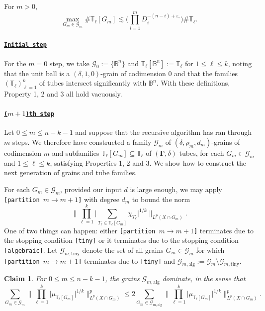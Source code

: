 \documentclass[reqno]{amsart}
\numberwithin{equation}{section}
\newcommand{\B}{\mathbb{B}}
\newcommand{\T}{\mathbb{T}}
\newcommand{\cG}{\mathcal{G}}
\newcommand{\bdGamma}{\boldsymbol{\Gamma}}
\theoremstyle{plain}
\newtheorem{claim}[theorem]{Claim}
\theoremstyle{definition}
\newcommand{\ttiny}{\mathrm{tiny}}
\newcommand{\alg}{\mathrm{alg}}
\begin{document}
  For $m > 0$,
\begin{equation}\tag*{$(3)_m$}
    \max_{G_m \in \cG_m} \# \T_{\ell}[G_m] \lesssim \Big(\prod_{i=1}^m D_i^{-(n-i) + \varepsilon_{\circ}}\Big) \# \T_{\ell}.
\end{equation}


\paragraph{\underline{\texttt{Initial step}}} For the $m = 0$ step, we take $\cG_0 := \{\B^n\}$ and $\T_{\ell}[\B^n] := \T_{\ell}$ for $1 \leq \ell \leq k$, noting that the unit ball is a $(\delta, 1, 0)$-grain of codimension $0$ and that the families $(\T_{\ell})_{\ell = 1}^k$ of tubes intersect significantly with $\B^n$. With these definitions, Property 1, 2 and 3 all hold vacuously.\medskip


\paragraph{\underline{\texttt{($m+1$)th step}}} Let $0 \leq m \leq n-k-1$ and suppose that the recursive algorithm has ran through $m$ steps. We therefore have constructed a family $\cG_m$ of $(\delta, \rho_m, d_m)$-grains of codimension $m$ and subfamilies $\T_{\ell}[G_m] \subseteq \T_{\ell}$ of $(\bdGamma,\delta)$-tubes, for each $G_m \in \cG_m$ and $1 \leq \ell \leq k$, satisfying Properties 1, 2 and 3. We show how to construct the next generation of grains and tube families. 

For each $G_m \in \cG_m$, provided our input $d$ is large enough, we may apply \texttt{[partition $m \to m+1$]} with degree $d_m$ to bound the norm 
\begin{equation}\label{eq: partition me}
    \Big\|\prod_{\ell = 1}^k\big|\sum_{T_{\ell} \in \T_{\ell}[G_m]} \chi_{T_{\ell}} \big|^{1/k}\Big\|_{L^p(X \cap G_m)}.
\end{equation} 
One of two things can happen: either \texttt{[partition $m \to m+1$]} terminates due to the stopping condition \texttt{[tiny]} or it terminates due to the stopping condition \texttt{[algebraic]}. Let $\cG_{m,\ttiny}$ denote the set of all grains $G_m \in \cG_m$ for which \texttt{[partition $m \to m+1$]} terminates due to \texttt{[tiny]} and $\cG_{m,\alg} := \cG_m \setminus \cG_{m,\ttiny}$.

\begin{claim}\label{claim: grain dom} For $0 \leq m \leq n - k -1$, the grains $\cG_{m,\alg}$ dominate, in the sense that 
\begin{equation}\label{eq: grain dom}
   \sum_{G_m \in \cG_m}\Big\|\prod_{\ell=1}^k \big|\mu_{\T_{\ell}[G_m]} \big|^{1/k}\Big\|_{L^p(X \cap G_m)}^p \leq 2 \sum_{G_m \in \cG_{m,\alg}} \Big\|\prod_{\ell=1}^k \big|\mu_{\T_{\ell}[G_m]}  \big|^{1/k}\Big\|_{L^p(X \cap G_m)}^p.
\end{equation} 
\end{claim}
\end{document}

